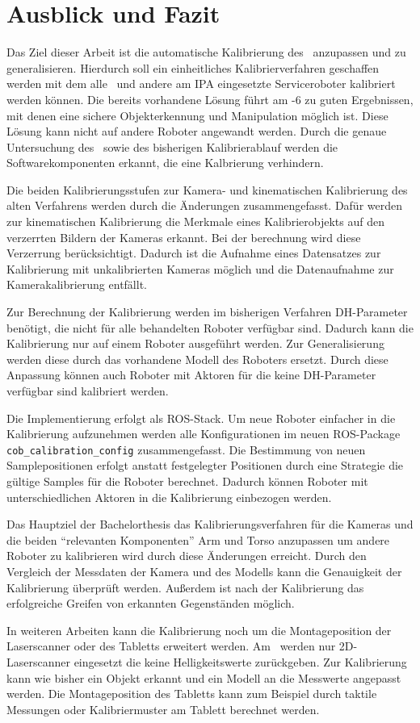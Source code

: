 \chapter{Ausblick und Fazit}

Das Ziel dieser Arbeit ist die automatische Kalibrierung des \cob\ anzupassen 
und zu generalisieren. Hierdurch soll ein einheitliches Kalibrierverfahren 
geschaffen werden mit dem alle \cob\ und andere am \ac{IPA} eingesetzte 
Serviceroboter kalibriert werden können. Die bereits vorhandene Lösung führt am
-6 zu guten Ergebnissen, mit denen eine sichere Objekterkennung und
Manipulation möglich ist. Diese Lösung kann nicht auf andere Roboter angewandt
werden. Durch die genaue Untersuchung des \cob\ sowie des bisherigen
Kalibrierablauf werden die Softwarekomponenten erkannt, die eine Kalbrierung 
verhindern. 

Die beiden Kalibrierungsstufen zur Kamera- und kinematischen Kalibrierung  des
alten Verfahrens werden durch die Änderungen zusammengefasst. Dafür werden zur 
kinematischen Kalibrierung die Merkmale eines Kalibrierobjekts auf den
verzerrten Bildern der Kameras erkannt. Bei der berechnung wird diese
Verzerrung berücksichtigt. Dadurch ist die Aufnahme eines Datensatzes zur
Kalibrierung mit unkalibrierten Kameras möglich und die Datenaufnahme zur
Kamerakalibrierung entfällt. 

Zur Berechnung der Kalibrierung werden im bisherigen Verfahren \ac{DH-Parameter}
benötigt, die nicht für alle behandelten Roboter verfügbar sind. Dadurch 
kann die Kalibrierung nur auf einem Roboter ausgeführt werden. Zur Generalisierung
werden diese durch das vorhandene Modell des Roboters ersetzt. Durch diese 
Anpassung können auch Roboter mit Aktoren für die keine \ac{DH-Parameter} 
verfügbar sind kalibriert werden.

Die Implementierung erfolgt als \ac{ROS}-Stack. Um neue Roboter einfacher in 
die Kalibrierung aufzunehmen werden alle Konfigurationen im neuen
\ac{ROS}-Package \texttt{cob\_calibration\_config} zusammengefasst. Die
Bestimmung von neuen Samplepositionen erfolgt anstatt festgelegter Positionen 
durch eine Strategie die gültige Samples für die Roboter berechnet. Dadurch 
können Roboter mit unterschiedlichen Aktoren in die Kalibrierung einbezogen 
werden. 

Das Hauptziel der Bachelorthesis das Kalibrierungsverfahren für die Kameras und
die beiden ``relevanten Komponenten'' Arm und Torso anzupassen um andere Roboter
zu kalibrieren wird durch diese Änderungen erreicht. Durch den Vergleich der
Messdaten der Kamera und des Modells kann die Genauigkeit der Kalibrierung 
überprüft werden. Außerdem ist nach der Kalibrierung das erfolgreiche Greifen 
von erkannten Gegenständen möglich. 

In weiteren Arbeiten kann die Kalibrierung noch um die Montageposition der
Laserscanner oder des Tabletts erweitert werden. Am \cob\ werden nur 2D-Laserscanner
eingesetzt die keine Helligkeitswerte zurückgeben. Zur Kalibrierung kann wie 
bisher ein Objekt erkannt und ein Modell an die Messwerte angepasst werden.
Die Montageposition des Tabletts kann zum Beispiel durch taktile Messungen oder
Kalibriermuster am Tablett berechnet werden.

